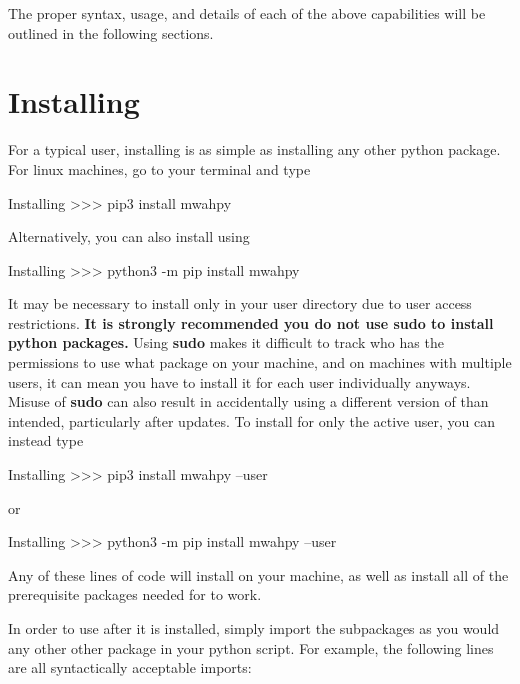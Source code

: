 \documentclass{article}
\begin{document}
The proper syntax, usage, and details of each of the above capabilities will be outlined in the following sections. 

\section{Installing \mwahpy}

For a typical user, installing \mwahpy is as simple as installing any other python package. For linux machines, go to your terminal and type \\

\begin{codelisting}{Installing \mwahpy}
>>> pip3 install mwahpy
\end{codelisting}

Alternatively, you can also install \mwahpy using \\

\begin{codelisting}{Installing \mwahpy}
>>> python3 -m pip install mwahpy
\end{codelisting}

It may be necessary to install \mwahpy only in your user directory due to user access restrictions. \textbf{It is strongly recommended you do not use sudo to install python packages.} Using \textbf{sudo} makes it difficult to track who has the permissions to use what package on your machine, and on machines with multiple users, it can mean you have to install it for each user individually anyways. Misuse of \textbf{sudo} can also result in accidentally using a different version of \mwahpy than intended, particularly after updates. To install \mwahpy for only the active user, you can instead type \\ 

\begin{codelisting}{Installing \mwahpy}
>>> pip3 install mwahpy --user
\end{codelisting}

or \\

\begin{codelisting}{Installing \mwahpy}
>>> python3 -m pip install mwahpy --user
\end{codelisting}

Any of these lines of code will install \mwahpy on your machine, as well as install all of the prerequisite packages needed for \mwahpy to work. 

In order to use \mwahpy after it is installed, simply import the subpackages as you would any other other package in your python script. For example, the following lines are all syntactically acceptable imports: \\
\end{document}
